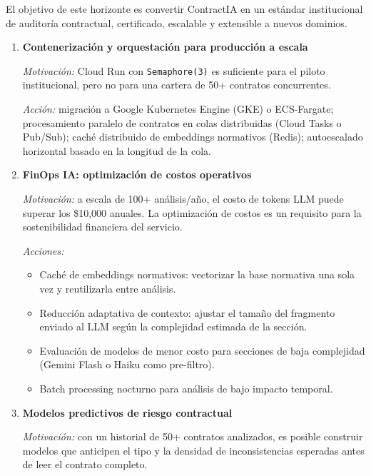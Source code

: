 El objetivo de este horizonte es convertir ContractIA en un estándar
institucional de auditoría contractual, certificado, escalable y extensible
a nuevos dominios.

\begin{enumerate}

    \item \textbf{Contenerización y orquestación para producción a escala}

    \textit{Motivación:} Cloud Run con \texttt{Semaphore(3)} es suficiente
    para el piloto institucional, pero no para una cartera de 50+ contratos
    concurrentes.

    \textit{Acción:} migración a Google Kubernetes Engine (GKE) o
    ECS-Fargate; procesamiento paralelo de contratos en colas distribuidas
    (Cloud Tasks o Pub/Sub); caché distribuido de embeddings normativos
    (Redis); autoescalado horizontal basado en la longitud de la cola.

    \item \textbf{FinOps IA: optimización de costos operativos}

    \textit{Motivación:} a escala de 100+ análisis/año, el costo de tokens
    LLM puede superar los \$10{,}000 anuales. La optimización de costos
    es un requisito para la sostenibilidad financiera del servicio.

    \textit{Acciones:}
    \begin{itemize}
        \item Caché de embeddings normativos: vectorizar la base normativa
        una sola vez y reutilizarla entre análisis.
        \item Reducción adaptativa de contexto: ajustar el tamaño del
        fragmento enviado al LLM según la complejidad estimada de la
        sección.
        \item Evaluación de modelos de menor costo para secciones de baja
        complejidad (Gemini Flash o Haiku como pre-filtro).
        \item Batch processing nocturno para análisis de bajo impacto temporal.
    \end{itemize}

    \item \textbf{Modelos predictivos de riesgo contractual}

    \textit{Motivación:} con un historial de 50+ contratos analizados,
    es posible construir modelos que anticipen el tipo y la densidad de
    inconsistencias esperadas antes de leer el contrato completo.


\end{enumerate}

